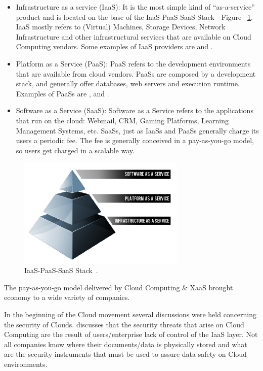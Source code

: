 \begin{itemize}
   \item{Infrastructure as a service (IaaS): It is the most simple kind of ``as-a-service'' product and is located on the base of the IaaS-PaaS-SaaS Stack - Figure ~\ref{fig:cloudstach}. IaaS mostly refers to (Virtual) Machines, Storage Devices, Network Infrastructure and other infrastructural services that are available on Cloud Computing vendors.} Some examples of IaaS providers are \cite{amazonec2} \cite{rackspace} and \cite{azure}. 
   \item{Platform as a Service (PaaS): PaaS refers to the development environments that are available from cloud vendors. PaaSs are composed by a development stack, and generally offer databases, web servers and execution runtime. Examples of PaaSs are \cite{beanstalk}, \cite{azure} and \cite{GAE}.  }
   \item{Software as a Service (SaaS): Software as a Service refers to the applications that run on the cloud: Webmail, CRM, Gaming Platforms, Learning Management Systems, etc. SaaSs, just as IaaSs and PaaSs generally charge its users a periodic fee. The fee is generally conceived in a pay-as-you-go model, so users get charged in a scalable way.  
}

\end{itemize}



\begin{figure}[ht!]
\centering
\includegraphics[width=80mm]{cloud_stack.png}
\caption{IaaS-PaaS-SaaS Stack~\cite{kepes2011understanding}.\label{fig:cloudstach}}
\end{figure}

The pay-as-you-go model delivered by Cloud Computing \& XaaS brought economy to a wide variety of companies. 

In the beginning of the Cloud movement several discussions were held concerning the security of Clouds. \cite{2010security} discusses that the security threats that arise on Cloud Computing are the result of users/enterprise lack of control of the IaaS layer. Not all companies know where their documents/data is physically stored and what are the security instruments that must be used to assure data safety on Cloud environments.

